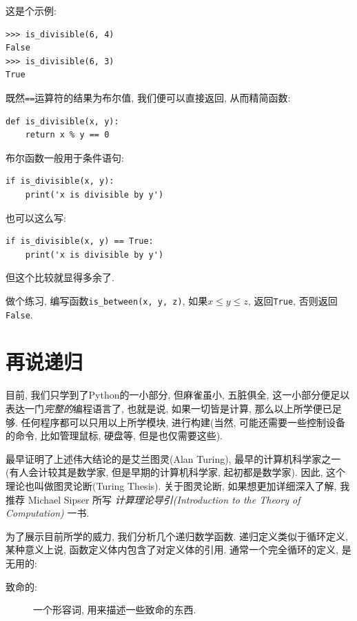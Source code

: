 \documentclass[10pt]{book}
\begin{document}
这是个示例:

\begin{verbatim}
>>> is_divisible(6, 4)
False
>>> is_divisible(6, 3)
True
\end{verbatim}
%
既然{\tt ==}运算符的结果为布尔值, 
我们便可以直接返回, 从而精简函数:

\begin{verbatim}
def is_divisible(x, y):
    return x % y == 0
\end{verbatim}
%
布尔函数一般用于条件语句:

\begin{verbatim}
if is_divisible(x, y):
    print('x is divisible by y')
\end{verbatim}
%
也可以这么写:

\begin{verbatim}
if is_divisible(x, y) == True:
    print('x is divisible by y')
\end{verbatim}
%
但这个比较就显得多余了.

做个练习, 编写函数\verb"is_between(x, y, z)", 
如果$x \le y \le z$, 返回{\tt True}, 否则返回{\tt False}.


\section{再说递归}
\label{more.recursion}

目前, 我们只学到了Python的一小部分, 但麻雀虽小, 五脏俱全, 
这一小部分便足以表达一门{\em 完整的}编程语言了, 
也就是说, 如果一切皆是计算, 那么以上所学便已足够. 
任何程序都可以只用以上所学模块, 进行构建(当然, 可能还需要一些控制设备
的命令, 比如管理鼠标, 硬盘等, 但是也仅需要这些).

最早证明了上述伟大结论的是艾兰图灵(Alan Turing), 最早的计算机科学家之一
(有人会计较其是数学家, 但是早期的计算机科学家, 起初都是数学家). 
因此, 这个理论也叫做图灵论断(Turing Thesis). 
关于图灵论断, 如果想更加详细深入了解, 我推荐 Michael Sipser 所写
 {\em 计算理论导引(Introduction to the Theory of Computation)} 一书.

为了展示目前所学的威力, 我们分析几个递归数学函数. 
递归定义类似于循环定义, 某种意义上说, 函数定义体内包含了对定义体的引用. 
通常一个完全循环的定义, 是无用的:

\begin{description}

\item[致命的:] 一个形容词, 用来描述一些致命的东西.

\end{description}
\end{document}
